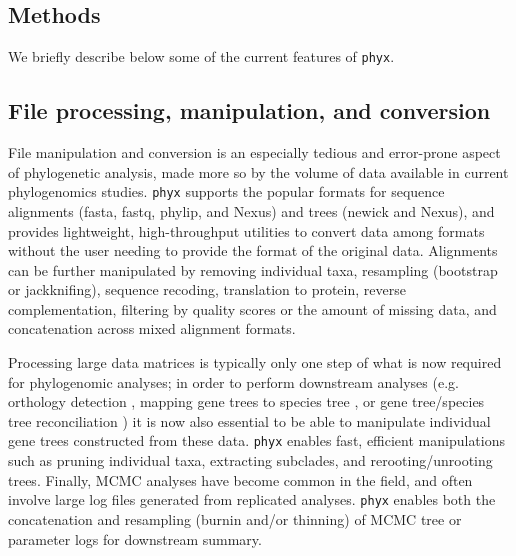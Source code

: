 \documentclass{bioinfo}
\begin{document}
\begin{methods}
\section{Methods}

We briefly describe below some of the current features of \texttt{phyx}.

\subsection{File processing, manipulation, and conversion}

File manipulation and conversion is an especially tedious and error-prone
aspect of phylogenetic analysis, made more so by the volume of data
available in current phylogenomics studies. \texttt{phyx} supports the
popular formats for sequence alignments (fasta, fastq, phylip, and Nexus)
and trees (newick and Nexus), and provides lightweight, high-throughput
utilities to convert data among formats without the user needing to
provide the format of the original data. Alignments can be further
manipulated by removing individual taxa, resampling (bootstrap or
jackknifing), sequence recoding, translation to protein, reverse
complementation, filtering by quality scores or the amount of missing
data, and concatenation across mixed alignment formats. 

Processing large data matrices is typically only one step of what is now
required for phylogenomic analyses; in order to perform downstream
analyses (e.g. orthology detection \citep{YangSmith2014}, mapping gene
trees to species tree \citep{Smith2015}, or gene tree/species tree
reconciliation \citep{Mirarab2014}) it is now also essential to be able
to manipulate individual gene trees constructed from these data.
\texttt{phyx} enables fast, efficient manipulations such as pruning
individual taxa, extracting subclades, and rerooting/unrooting trees.
Finally, MCMC analyses have become common in the field, and often involve
large log files generated from replicated analyses. \texttt{phyx} enables
both the concatenation and resampling (burnin and/or thinning) of MCMC
tree or parameter logs for downstream summary.


\end{methods}
\end{document}
